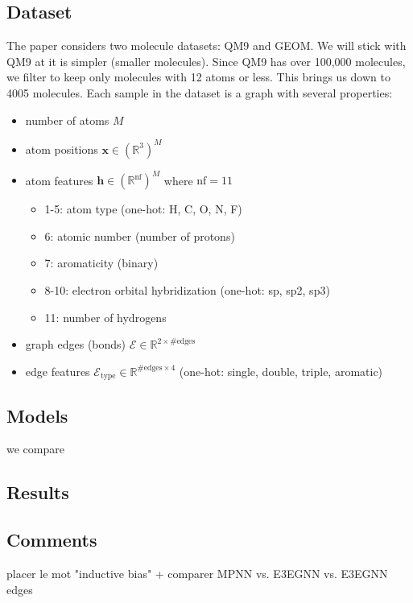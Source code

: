 \documentclass[sigconf]{acmart}
\begin{document}
\subsection{Dataset}
The paper considers two molecule datasets: QM9 and GEOM. We will stick with QM9 at it is simpler (smaller molecules). Since QM9 has over 100,000 molecules, we filter to keep only molecules with 12 atoms or less. This brings us down to 4005 molecules.
Each sample in the dataset is a graph with several properties:
\begin{itemize}
    \item number of atoms $M$
    \item atom positions $\mathbf{x} \in (\mathbb{R}^3)^M$
    \item atom features $\mathbf{h} \in (\mathbb{R}^\text{nf})^M$ where $\text{nf} = 11$
    \begin{itemize}
        \item 1-5: atom type (one-hot: H, C, O, N, F)
        \item 6: atomic number (number of protons)
        \item 7: aromaticity (binary)
        \item 8-10: electron orbital hybridization (one-hot: sp, sp2, sp3)
        \item 11: number of hydrogens
    \end{itemize}
    \item graph edges (bonds) $\mathcal{E} \in \mathbb{R}^{2\times\text{\#edges}}$
    \item edge features $\mathcal{E}_\text{type} \in \mathbb{R}^{\text{\#edges}\times 4}$ (one-hot: single, double, triple, aromatic)
\end{itemize}

\subsection{Models}
we compare

\subsection{Results}

\subsection{Comments}

placer le mot "inductive bias"
+
comparer MPNN vs. E3EGNN vs. E3EGNN edges



\end{document}
